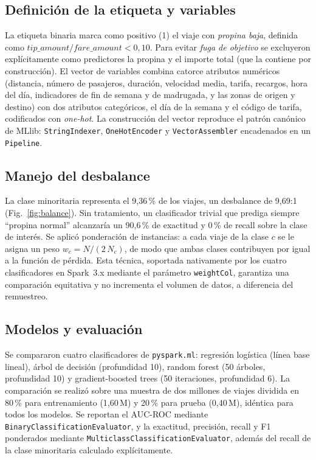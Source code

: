 \documentclass[conference]{IEEEtran}
\begin{document}
\subsection{Definición de la etiqueta y variables}
La etiqueta binaria marca como positivo (1) el viaje con \emph{propina baja},
definida como $\textit{tip\_amount}/\textit{fare\_amount} < 0{,}10$. Para evitar
\emph{fuga de objetivo} se excluyeron explícitamente como predictores la propina y
el importe total (que la contiene por construcción). El vector de variables combina
catorce atributos numéricos (distancia, número de pasajeros, duración, velocidad
media, tarifa, recargos, hora del día, indicadores de fin de semana y de
madrugada, y las zonas de origen y destino) con dos atributos categóricos, el día
de la semana y el código de tarifa, codificados con \emph{one-hot}. La construcción del
vector reproduce el patrón canónico de MLlib: \texttt{StringIndexer},
\texttt{OneHotEncoder} y \texttt{VectorAssembler} encadenados en un
\texttt{Pipeline}.

\subsection{Manejo del desbalance}
La clase minoritaria representa el 9{,}36\,\% de los viajes, un desbalance de
9{,}69:1 (Fig.~\ref{fig:balance}). Sin tratamiento, un clasificador trivial que
prediga siempre ``propina normal'' alcanzaría un 90{,}6\,\% de exactitud y 0\,\%
de recall sobre la clase de interés. Se aplicó ponderación de instancias: a cada
viaje de la clase $c$ se le asigna un peso $w_c = N / (2\,N_c)$, de modo que ambas
clases contribuyen por igual a la función de pérdida. Esta técnica, soportada
nativamente por los cuatro clasificadores en Spark~3.x mediante el parámetro
\texttt{weightCol}, garantiza una comparación equitativa y no incrementa el volumen
de datos, a diferencia del remuestreo.

\subsection{Modelos y evaluación}
Se compararon cuatro clasificadores de \texttt{pyspark.ml}: regresión logística
(línea base lineal), árbol de decisión (profundidad 10), random forest (50 árboles,
profundidad 10) y gradient-boosted trees (50 iteraciones, profundidad 6). La
comparación se realizó sobre una muestra de dos millones de viajes dividida en
80\,\% para entrenamiento (1{,}60\,M) y 20\,\% para prueba (0{,}40\,M), idéntica
para todos los modelos. Se reportan el AUC-ROC mediante
\texttt{BinaryClassificationEvaluator}, y la exactitud, precisión, recall y F1
ponderados mediante \texttt{MulticlassClassificationEvaluator}, además del recall
de la clase minoritaria calculado explícitamente.
\end{document}
